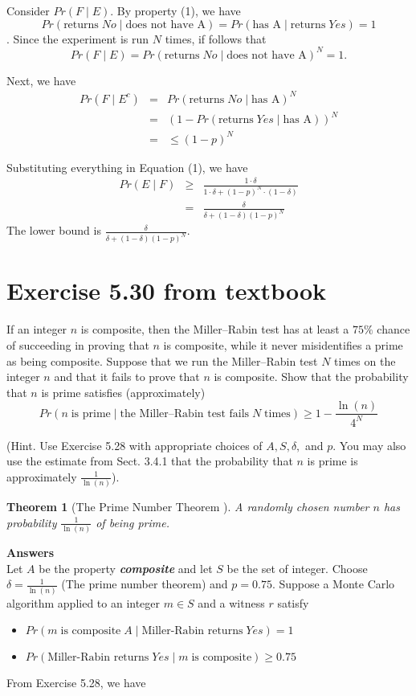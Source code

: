 \documentclass[12pt]{ut-thesis}
\newtheorem{thm}[subsection]{Theorem}
\theoremstyle{definition}
\begin{document}
	Consider $Pr(F\;|\;E).$ By property (1), we have
	$$Pr(\text{returns}\; No\;|\;\text{does not have A}) = Pr(\text{has A} \; | \; \text{returns}\; Yes)= 1$$. 
	Since the experiment is run $N$ times, if follows that 
	\[Pr(F\;|\;E) = Pr(\text{returns}\; No\;|\;\text{does not have A})^N = 1.\]

	Next, we have
	\begin{eqnarray*}
		Pr(F\; |\; E^c) &=&Pr(\text{returns}\; No\;|\;\text{has A})^N\\ 
		&=& \left(1 - Pr(\text{returns}\; Yes\;|\;\text{has A})\right)^N\\
		&=& \le (1 - p)^N
	\end{eqnarray*}

	Substituting everything in Equation (1), we have
	\begin{eqnarray*}
		Pr(E \;|\; F) &\ge& \frac{1\cdot\delta}{1\cdot\delta + (1 - p)^N\cdot(1-\delta)}\\
		&=&  \frac{\delta}{\delta + (1 - \delta)(1 - p)^N}
	\end{eqnarray*}
	The lower bound is $\frac{\delta}{\delta + (1 - \delta)(1 - p)^N}.$
	
	\section*{Exercise 5.30 from textbook}
	If an integer $n$ is composite, then the Miller–Rabin test has at least a $75\%$ 
	chance of succeeding in proving that $n$ is composite, while it never misidentifies
	a prime as being composite. Suppose that we run the Miller–Rabin test $N$ times on
	the integer $n$ and that it fails to prove that $n$ is composite. 
	Show that the probability that $n$ is prime satisfies (approximately)
	\[Pr(n\; \text{is prime}\; |\; \text{the Miller–Rabin test fails}\; N\; \text{times}) \ge 1 - \frac{\ln( n )}{4^N}\]
	
	(Hint. Use Exercise 5.28 with appropriate choices of $A, S, \delta,$ and $p$. You may also use the estimate 
	from Sect. 3.4.1 that the probability that $n$ is prime is approximately $\frac{1}{\ln(n)}$).
	
	\begin{thm}[The Prime Number Theorem \cite{hoffstein2014}]
		A randomly chosen number $n$ has
probability $\frac{1}{\ln(n)}$ of being prime.
	\end{thm}
	\textbf{Answers}\\
	Let $A$ be the property \emph{\textbf{composite}} and let $S$ be the set of integer. 
	Choose $\delta = \frac{1}{\ln(n)}$ (The prime number theorem) and $p = 0.75$. Suppose a Monte Carlo algorithm  applied 
	to an integer $m \in S$ and a witness $r$ satisfy
	\begin{itemize}
		\item $Pr(m\; \text{is composite}\; A \;|\; \text{Miller-Rabin returns}\; Yes) = 1$
		\item $Pr(\text{Miller-Rabin returns}\; Yes \;|\; m\; \text{is composite}) \ge 0.75$
	\end{itemize}
	From Exercise 5.28, we have
	
\end{document}
